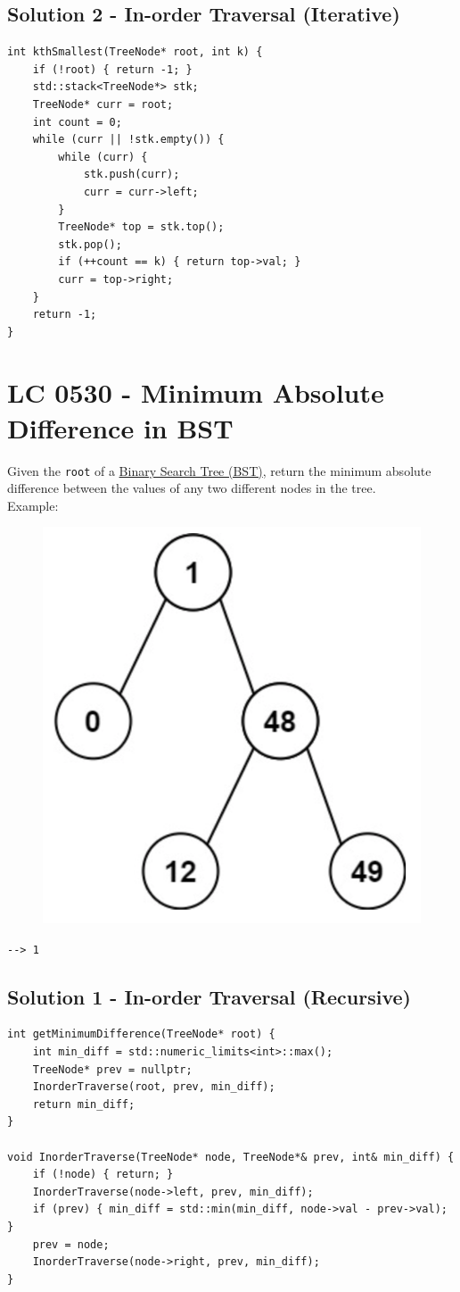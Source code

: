 \subsection*{Solution 2 - In-order Traversal (Iterative)}
\begin{lstlisting}
int kthSmallest(TreeNode* root, int k) {
	if (!root) { return -1; }
	std::stack<TreeNode*> stk;
	TreeNode* curr = root;
	int count = 0;
	while (curr || !stk.empty()) {
		while (curr) {
			stk.push(curr);
			curr = curr->left;
		}
		TreeNode* top = stk.top();
		stk.pop();
		if (++count == k) { return top->val; }
		curr = top->right;
	}
	return -1;
}
\end{lstlisting}

\section{LC 0530 - Minimum Absolute Difference in BST}
Given the {\colorbox{CodeBackground}{\lstinline|root|}} of a \ul{Binary Search Tree (BST)}, return the minimum absolute difference between the values of any two different nodes in the tree.\\

Example:
\begin{figure}[H]
	\centering
	\includegraphics[width=0.25\linewidth]{images/lc0530_example}
	\label{fig:lc0530example}
\end{figure}
{\colorbox{CodeBackground}{\lstinline|--> 1|}}

\subsection*{Solution 1 - In-order Traversal (Recursive)}
\begin{lstlisting}
int getMinimumDifference(TreeNode* root) {
	int min_diff = std::numeric_limits<int>::max();
	TreeNode* prev = nullptr;
	InorderTraverse(root, prev, min_diff);
	return min_diff;
}

void InorderTraverse(TreeNode* node, TreeNode*& prev, int& min_diff) {
	if (!node) { return; }
	InorderTraverse(node->left, prev, min_diff);
	if (prev) { min_diff = std::min(min_diff, node->val - prev->val); }
	prev = node;
	InorderTraverse(node->right, prev, min_diff);
}
\end{lstlisting}

